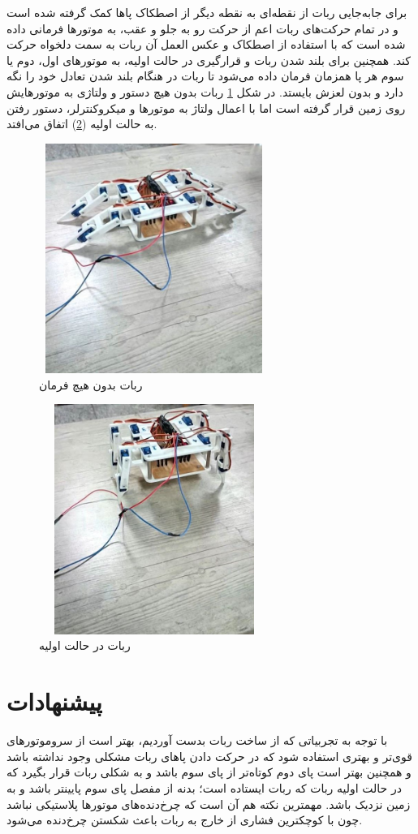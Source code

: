 \newpage
برای جابه‌جایی ربات از نقطه‌ای به نقطه دیگر از اصطکاک پاها کمک گرفته شده است و در تمام حرکت‌های ربات اعم از حرکت رو به جلو و عقب، به موتورها فرمانی داده شده است که با استفاده از اصطکاک و عکس العمل آن ربات به سمت دلخواه حرکت کند. همچنین برای بلند شدن ربات و قرارگیری در حالت اولیه، به موتورهای اول، دوم یا سوم هر پا همزمان فرمان داده می‌شود تا ربات در هنگام بلند شدن تعادل خود را نگه دارد و بدون لعزش بایستد. در شکل \ref{State0} ربات بدون هیچ دستور و ولتاژی به موتورهایش روی زمین قرار گرفته است اما با اعمال ولتاژ به موتورها و میکروکنترلر، دستور رفتن به حالت اولیه (\ref{State1}) اتفاق می‌افتد.
    \begin{figure}[!h]
	\centering
	\includegraphics[width=7.5cm,height=7.5cm]{./Images/CH5/State0.jpg}
	\caption{ربات بدون هیچ فرمان}
	\label{State0}
	\end{figure}
	\begin{figure}[!h]
	\centering
	\includegraphics[width=7.5cm,height=7.5cm]{./Images/CH5/State1.jpg}
	\caption{ربات در حالت اولیه}
	\label{State1}
	\end{figure}
	
\section{پیشنهادات}
با توجه به تجربیاتی که از ساخت ربات بدست آوردیم، بهتر است از سروموتورهای قوی‌تر و بهتری استفاده شود که در حرکت دادن پاهای ربات مشکلی وجود نداشته باشد و همچنین بهتر است پای دوم کوتاه‌تر از پای سوم باشد و به شکلی ربات قرار بگیرد که در حالت اولیه ربات که ربات ایستاده است؛ بدنه از مفصل پای سوم پایینتر باشد و به زمین نزدیک باشد. مهمترین نکته هم آن است که چرخ‌دنده‌های موتورها پلاستیکی نباشد چون با کوچکترین فشاری از خارج به ربات باعث شکستن چرخ‌دنده می‌شود.

